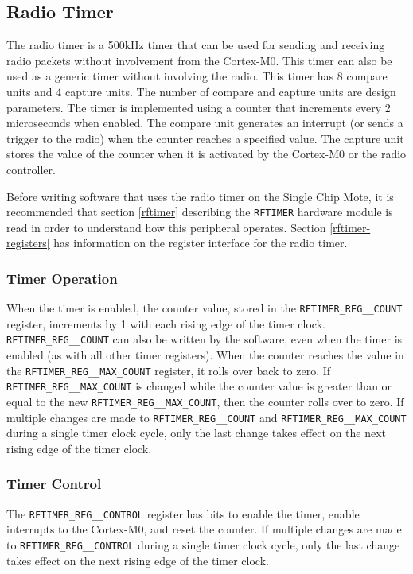 \subsection{Radio Timer}
The radio timer is a 500kHz timer that can be used for sending and receiving radio packets without involvement from the Cortex-M0. This timer can also be used as a generic timer without involving the radio. This timer has 8 compare units and 4 capture units. The number of compare and capture units are design parameters. The timer is implemented using a counter that increments every 2 microseconds when enabled. The compare unit generates an interrupt (or sends a trigger to the radio) when the counter reaches a specified value. The capture unit stores the value of the counter when it is activated by the Cortex-M0 or the radio controller.

Before writing software that uses the radio timer on the Single Chip Mote, it is recommended that section \ref{rftimer} describing the \texttt{RFTIMER} hardware module is read in order to understand how this peripheral operates. Section \ref{rftimer-registers} has information on the register interface for the radio timer.

\subsubsection{Timer Operation}
When the timer is enabled, the counter value, stored in the \texttt{RFTIMER\_REG\_\_COUNT} register, increments by 1 with each rising edge of the timer clock. \texttt{RFTIMER\_REG\_\_COUNT} can also be written by the software, even when the timer is enabled (as with all other timer registers). When the counter reaches the value in the \texttt{RFTIMER\_REG\_\_MAX\_COUNT} register, it rolls over back to zero. If \texttt{RFTIMER\_REG\_\_MAX\_COUNT} is changed while the counter value is greater than or equal to the new \texttt{RFTIMER\_REG\_\_MAX\_COUNT}, then the counter rolls over to zero. If multiple changes are made to \texttt{RFTIMER\_REG\_\_COUNT} and \texttt{RFTIMER\_REG\_\_MAX\_COUNT} during a single timer clock cycle, only the last change takes effect on the next rising edge of the timer clock.

\subsubsection{Timer Control}
The \texttt{RFTIMER\_REG\_\_CONTROL} register has bits to enable the timer, enable interrupts to the Cortex-M0, and reset the counter. If multiple changes are made to \texttt{RFTIMER\_REG\_\_CONTROL} during a single timer clock cycle, only the last change takes effect on the next rising edge of the timer clock.

